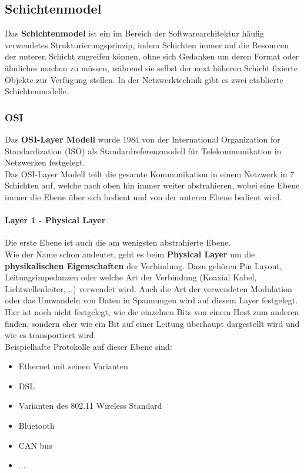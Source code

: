 \documentclass[12pt,a4paper]{report}
\begin{document}
\begin{onehalfspace}
\subsection{Schichtenmodel}
Das \textbf{Schichtenmodel} ist ein im Bereich der Softwarearchitektur häufig verwendetes Strukturierungsprinzip, indem Schichten immer auf die Resourcen der unteren Schicht zugreifen können, ohne sich Gedanken um deren Format oder ähnliches machen zu müssen, während sie selbst der next höheren Schicht fixierte Objekte zur Verfügung stellen. In der Netzwerktechnik gibt es zwei etablierte Schichtenmodelle.
\subsubsection{OSI}
Das \textbf{OSI-Layer Modell} wurde 1984 von der International Organization for Standardization (ISO) als Standardreferenzmodell für Telekommunikation in Netzwerken festgelegt.\\
Das OSI-Layer Modell teilt die gesamte Kommunikation in einem Netzwerk in 7 Schichten auf, welche nach oben hin immer weiter abstrahieren, wobei eine Ebene immer die Ebene über sich bedient und von der unteren Ebene bedient wird.\\
\paragraph{Layer 1 - Physical Layer}
Die erste Ebene ist auch die am wenigsten abstrahierte Ebene.\\
Wie der Name schon andeutet, geht es beim \textbf{Physical Layer} um die \textbf{physikalischen Eigenschaften} der Verbindung. Dazu gehören Pin Layout, Leitungsimpedanzen oder welche Art der Verbindung (Koaxial Kabel, Lichtwellenleiter, ..) verwendet wird. Auch die Art der verwendeten Modulation oder das Umwandeln von Daten in Spannungen wird auf diesem Layer festgelegt.\\
Hier ist noch nicht festgelegt, wie die einzelnen Bits von einem Host zum anderen finden, sondern eher wie ein Bit auf einer Leitung überhaupt dargestellt wird und wie es transportiert wird.\\

Beispielhafte Protokolle auf dieser Ebene sind:
\begin{itemize}
\item Ethernet mit seinen Varianten
\item DSL 
\item Varianten des 802.11 Wireless Standard
\item Bluetooth
\item CAN bus
\item ...
\end{itemize}

\end{onehalfspace}
\end{document}
